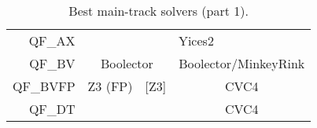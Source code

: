 \begin{table}[]
\begin{center}
{\begin{tabular}{rcccc}
\multicolumn{1}{r|}{QF\_AX}     & \multicolumn{4}{c|}{Yices2}                                                                                                                 \\ \cline{2-5} 
\multicolumn{1}{r|}{QF\_BV}     & \multicolumn{2}{c|}{Boolector}                                      & \multicolumn{2}{c|}{Boolector/MinkeyRink}                             \\ \cline{2-5} 
\multicolumn{1}{r|}{QF\_BVFP}   & \multicolumn{1}{c|}{Z3 (FP)}  & \multicolumn{2}{c|}{{[}Z3{]}}                                       & \multicolumn{1}{c|}{CVC4}             \\ \cline{2-5} 
QF\_DT                          & \multicolumn{1}{l}{}          & \multicolumn{1}{l|}{}               & \multicolumn{2}{c|}{CVC4}                                             \\ \cline{4-5} 
\end{tabular}}
\end{center}
\caption{\label{tab:winners-main-1} Best main-track solvers (part 1).}
\end{table}

